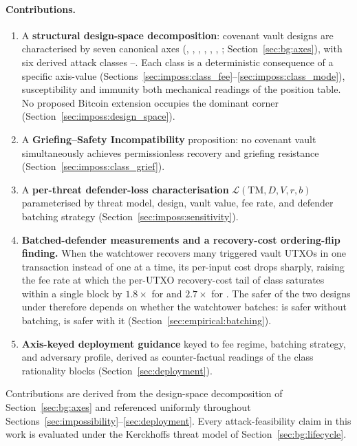 \paragraph{Contributions.}
\begin{enumerate}
  \item A \textbf{structural design-space decomposition}: covenant
    vault designs are characterised by seven canonical axes
    (\axauth{}, \axrevault{}, \axfee{}, \axwdbind{}, \axrecbind{},
    \axopsurf{}, \axintro{}; Section~\ref{sec:bg:axes}), with six
    derived attack classes \classfee{}--\classmode{}. Each class
    is a deterministic consequence of a specific axis-value
    (Sections~\ref{sec:imposs:class_fee}--\ref{sec:imposs:class_mode}),
    susceptibility and immunity both mechanical readings of the
    position table. No proposed Bitcoin extension occupies
    the dominant corner (Section~\ref{sec:imposs:design_space}).
  \item A \textbf{Griefing--Safety Incompatibility} proposition: no
    covenant vault simultaneously achieves permissionless recovery and
    griefing resistance (Section~\ref{sec:imposs:class_grief}).
  \item A \textbf{per-threat defender-loss characterisation}
    $\mathcal{L}(\mathrm{TM}, D, V, r, b)$ parameterised by threat
    model, design, vault value, fee rate, and defender batching
    strategy (Section~\ref{sec:imposs:sensitivity}).
  \item \textbf{Batched-defender measurements and a recovery-cost
    ordering-flip finding.} When the watchtower recovers many
    triggered vault UTXOs in one transaction instead of one at a
    time, its per-input cost drops sharply, raising the fee rate
    at which the per-UTXO recovery-cost tail of class \classscale{}
    saturates within a single block by $1.8\times$ for \opccv{} and
    $2.7\times$ for \opvault{}. The safer of the two designs under
    \classscale{} therefore depends on whether the watchtower
    batches: \opccv{} is safer without batching, \opvault{} is safer
    with it (Section~\ref{sec:empirical:batching}).
  \item \textbf{Axis-keyed deployment guidance} keyed to fee
    regime, batching strategy, and adversary profile, derived as
    counter-factual readings of the class rationality blocks
    (Section~\ref{sec:deployment}).
\end{enumerate}

Contributions are derived from the design-space decomposition of
Section~\ref{sec:bg:axes} and referenced uniformly throughout
Sections~\ref{sec:impossibility}--\ref{sec:deployment}. Every
attack-feasibility claim in this work is evaluated under the
Kerckhoffs threat model of Section~\ref{sec:bg:lifecycle}.

